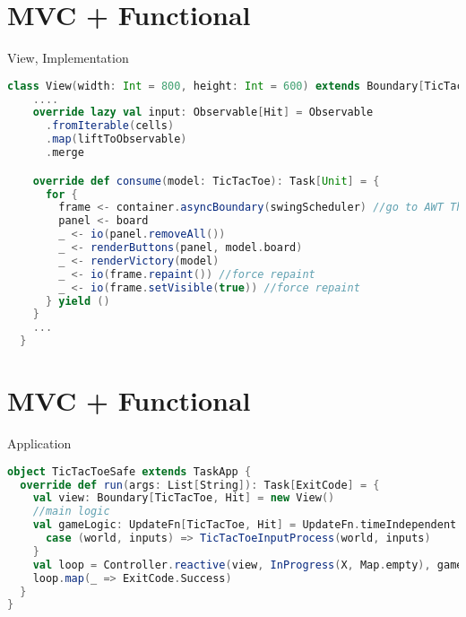 \documentclass[presentation]{beamer}
\begin{document}
\section{MVC + Functional}
\begin{frame}[fragile]{View, Implementation}
\begin{lstlisting}[language=Scala]
  class View(width: Int = 800, height: Int = 600) extends Boundary[TicTacToe, Hit] {
    ....
    override lazy val input: Observable[Hit] = Observable
      .fromIterable(cells)
      .map(liftToObservable)
      .merge

    override def consume(model: TicTacToe): Task[Unit] = {
      for {
        frame <- container.asyncBoundary(swingScheduler) //go to AWT Thread, todo it is a view task or controller task?
        panel <- board
        _ <- io(panel.removeAll())
        _ <- renderButtons(panel, model.board)
        _ <- renderVictory(model)
        _ <- io(frame.repaint()) //force repaint
        _ <- io(frame.setVisible(true)) //force repaint
      } yield ()
    }
    ...
  }
\end{lstlisting}
\end{frame}
\section{MVC + Functional}
\begin{frame}[fragile]{Application}
\begin{lstlisting}[language=Scala]
object TicTacToeSafe extends TaskApp {
  override def run(args: List[String]): Task[ExitCode] = {
    val view: Boundary[TicTacToe, Hit] = new View()
    //main logic
    val gameLogic: UpdateFn[TicTacToe, Hit] = UpdateFn.timeIndependent { 
      case (world, inputs) => TicTacToeInputProcess(world, inputs)
    }
    val loop = Controller.reactive(view, InProgress(X, Map.empty), gameLogic)
    loop.map(_ => ExitCode.Success)
  }
}
\end{lstlisting}
\end{frame}
\end{document}
